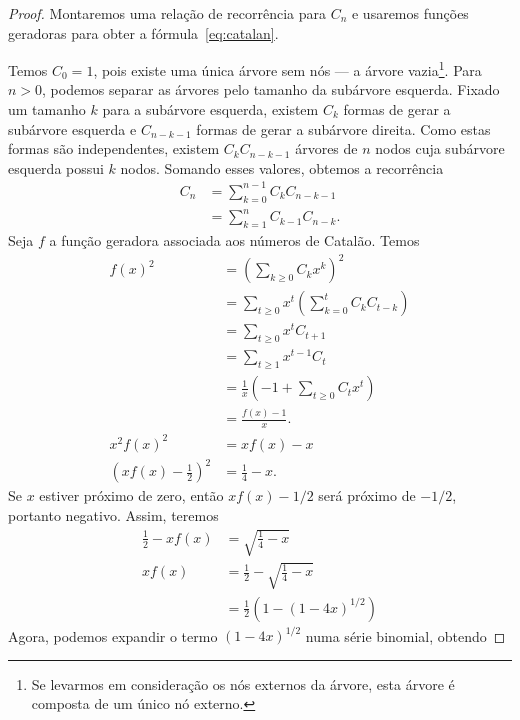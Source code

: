 \begin{proof}
    Montaremos uma relação de recorrência para $C_n$
    e usaremos funções geradoras para obter a fórmula~\ref{eq:catalan}.

    Temos $C_0 = 1$, pois existe uma única árvore sem nós --- a árvore vazia\footnote{
        Se levarmos em consideração os nós externos da árvore,
        esta árvore é composta de um único nó externo.
    }.
    Para $n > 0$,
    podemos separar as árvores pelo tamanho da subárvore esquerda.
    Fixado um tamanho $k$ para a subárvore esquerda,
    existem $C_{k}$ formas de gerar a subárvore esquerda
    e $C_{n-k-1}$ formas de gerar a subárvore direita.
    Como estas formas são independentes,
    existem $C_{k} C_{n-k-1}$ árvores de $n$ nodos
    cuja subárvore esquerda possui $k$ nodos.
    Somando esses valores, obtemos a recorrência
    \begin{align*}
        C_n &= \sum_{k = 0}^{n-1} C_k C_{n-k-1} \\
            &= \sum_{k = 1}^n C_{k-1} C_{n-k}.
    \end{align*}
    Seja $f$ a função geradora associada aos números de Catalão.
    Temos
    \begin{align*}
        f(x)^2 &= \left(\sum_{k \geq 0} C_k x^k\right)^2 \\
               &= \sum_{t \geq 0} x^t \left( \sum_{k = 0}^t C_k C_{t-k} \right) \\
               &= \sum_{t \geq 0} x^t C_{t+1} \\
               &= \sum_{t \geq 1} x^{t-1} C_t \\
               &= \frac 1 x \left( -1 + \sum_{t \geq 0} C_t x^t \right) \\
               &= \frac{f(x) - 1}{x}. \\
        x^2 f(x)^2 &= xf(x) - x \\
        \left(xf(x) - \frac 1 2\right)^2 &= \frac 1 4 - x.
    \end{align*}
    Se $x$ estiver próximo de zero,
    então $xf(x) - 1/2$ será próximo de $-1/2$,
    portanto negativo.
    Assim, teremos
    \begin{align*}
        \frac 1 2 - xf(x) &= \sqrt{\frac 1 4 - x} \\
        xf(x) &= \frac 1 2 - \sqrt{\frac 1 4 - x} \\
              &= \frac 1 2 (1 - (1 - 4x)^{1/2})
    \end{align*}
    Agora, podemos expandir o termo $(1 - 4x)^{1/2}$ numa série binomial,
    obtendo

\end{proof}
